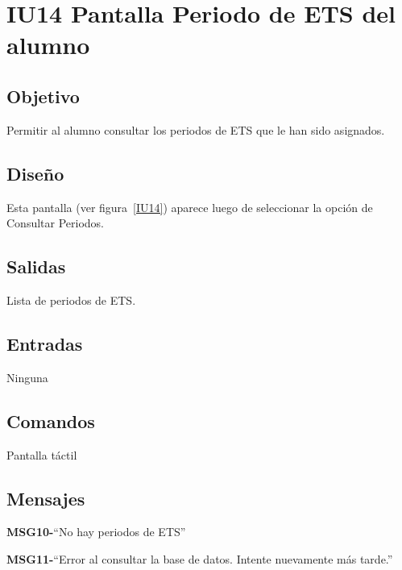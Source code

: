 \section{IU14 Pantalla Periodo de ETS del alumno}

\subsection{Objetivo}
	Permitir al alumno consultar los periodos de ETS que le han sido asignados. 

\subsection{Diseño}
	Esta pantalla  (ver figura~\ref{IU14}) aparece luego de seleccionar la opción de Consultar Periodos.


\subsection{Salidas}
	Lista de periodos de ETS. 

\subsection{Entradas}
Ninguna

\subsection{Comandos}

Pantalla táctil


\subsection{Mensajes}

\begin{Citemize}
	\item {\bf MSG10-}{``No hay periodos de ETS''}
	\item {\bf MSG11-}{``Error al consultar la base de datos. Intente nuevamente más tarde.''}
\end{Citemize}

